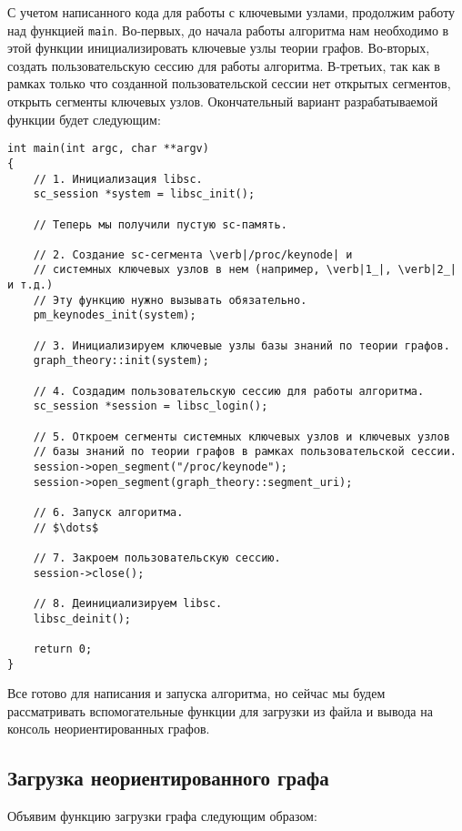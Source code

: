 С учетом написанного кода для работы с ключевыми узлами, продолжим
работу над функцией \lstinline|main|. Во-первых, до начала работы
алгоритма нам необходимо в этой функции инициализировать ключевые узлы
теории графов. Во-вторых, создать пользовательскую сессию для работы
алгоритма. В-третьих, так как в рамках только что созданной
пользовательской сессии нет открытых сегментов, открыть сегменты
ключевых узлов. Окончательный вариант разрабатываемой функции будет
следующим:

\begin{lstlisting}[texcl]
int main(int argc, char **argv)
{
    // 1. Инициализация libsc.
    sc_session *system = libsc_init();

    // Теперь мы получили пустую sc-память.

    // 2. Создание sc-сегмента \verb|/proc/keynode| и
    // системных ключевых узлов в нем (например, \verb|1_|, \verb|2_| и т.д.)
    // Эту функцию нужно вызывать обязательно.
    pm_keynodes_init(system);

    // 3. Инициализируем ключевые узлы базы знаний по теории графов.
    graph_theory::init(system);

    // 4. Создадим пользовательскую сессию для работы алгоритма.
    sc_session *session = libsc_login();

    // 5. Откроем сегменты системных ключевых узлов и ключевых узлов
    // базы знаний по теории графов в рамках пользовательской сессии.
    session->open_segment("/proc/keynode");
    session->open_segment(graph_theory::segment_uri);

    // 6. Запуск алгоритма.
    // $\dots$

    // 7. Закроем пользовательскую сессию.
    session->close();

    // 8. Деинициализируем libsc.
    libsc_deinit();

    return 0;
}
\end{lstlisting}

Все готово для написания и запуска алгоритма, но сейчас мы будем
рассматривать вспомогательные функции для загрузки из файла и вывода
на консоль неориентированных графов.

\subsection{Загрузка неориентированного графа}
\label{sec:libscprg_load_graph}

Объявим функцию загрузки графа следующим образом:

